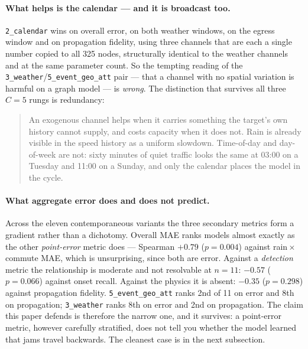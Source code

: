 \documentclass[letterpaper]{article}
\begin{document}
\paragraph{What helps is the calendar --- and it is broadcast too.} \texttt{2\_calendar} wins on overall error, on both weather windows, on the egress window and on propagation fidelity, using three channels that are each a single number copied to all 325 nodes, structurally identical to the weather channels and at the same parameter count. So the tempting reading of the \texttt{3\_weather}/\texttt{5\_event\_geo\_att} pair --- that a channel with no spatial variation is harmful on a graph model --- is \emph{wrong}. The distinction that survives all three $C=5$ rungs is redundancy:

\begin{quote}
An exogenous channel helps when it carries something the target's own history cannot supply, and costs capacity when it does not. Rain is already visible in the speed history as a uniform slowdown. Time-of-day and day-of-week are not: sixty minutes of quiet traffic looks the same at 03:00 on a Tuesday and 11:00 on a Sunday, and only the calendar places the model in the cycle.
\end{quote}

\paragraph{What aggregate error does and does not predict.} Across the eleven contemporaneous variants the three secondary metrics form a gradient rather than a dichotomy. Overall MAE ranks models almost exactly as the other \emph{point-error} metric does --- Spearman $+0.79$ ($p=0.004$) against rain\,$\times$\,commute MAE, which is unsurprising, since both are error. Against a \emph{detection} metric the relationship is moderate and not resolvable at $n=11$: $-0.57$ ($p=0.066$) against onset recall. Against the physics it is absent: $-0.35$ ($p=0.298$) against propagation fidelity. \texttt{5\_event\_geo\_att} ranks 2nd of 11 on error and 8th on propagation; \texttt{3\_weather} ranks 8th on error and 2nd on propagation. The claim this paper defends is therefore the narrow one, and it survives: a point-error metric, however carefully stratified, does not tell you whether the model learned that jams travel backwards. The cleanest case is in the next subsection.
\end{document}
